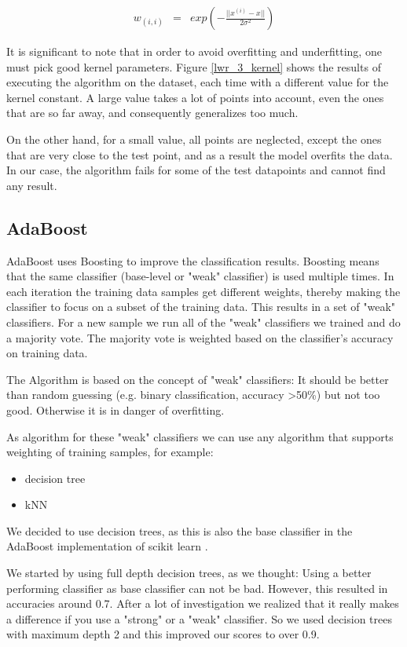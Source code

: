 \documentclass[12pt, a4paper, onecolumn, oneside, parskip=half]{scrartcl}
\begin{document}
\begin{eqnarray}
w_{(i,i)} &=& exp(-\frac{||x^{(i)}-x||}{2\sigma^2})
\end{eqnarray}



It is significant to note that in order to avoid overfitting and underfitting, one must pick good kernel parameters. Figure \ref{lwr_3_kernel} shows the results of executing the algorithm on the dataset, each time with a different value for the kernel constant. A large value takes a lot of points into account, even the ones that are so far away, and consequently generalizes too much.

On the other hand, for a small value, all points are neglected, except the ones that are very close to the test point, and as a result the model overfits the data. In our case, the algorithm fails for some of the test datapoints and cannot find any result.

\subsection{AdaBoost}

AdaBoost uses Boosting to improve the classification results. Boosting means that the same classifier (base-level or "weak" classifier) is used multiple times. In each iteration the training data samples get different weights, thereby making the classifier to focus on a subset of the training data. This results in a set of "weak" classifiers. For a new sample we run all of the "weak" classifiers we trained and do a majority vote. The majority vote is weighted based on the classifier's accuracy on training data.

The Algorithm is based on the concept of "weak" classifiers: It should be better than random guessing (e.g. binary classification, accuracy \textgreater 50\%) but not too good. Otherwise it is in danger of overfitting.

As algorithm for these "weak" classifiers we can use any algorithm that supports weighting of training samples, for example:
\begin{itemize}
\item decision tree
\item kNN
\end{itemize}

We decided to use decision trees, as this is also the base classifier in the AdaBoost implementation of scikit learn \cite{scikit_adaboost_doc}.

We started by using full depth decision trees, as we thought: Using a better performing classifier as base classifier can not be bad. However, this resulted in accuracies around 0.7. After a lot of investigation we realized that it really makes a difference if you use a "strong" or a "weak" classifier. So we used decision trees with maximum depth 2 and this improved our scores to over 0.9.
\end{document}
